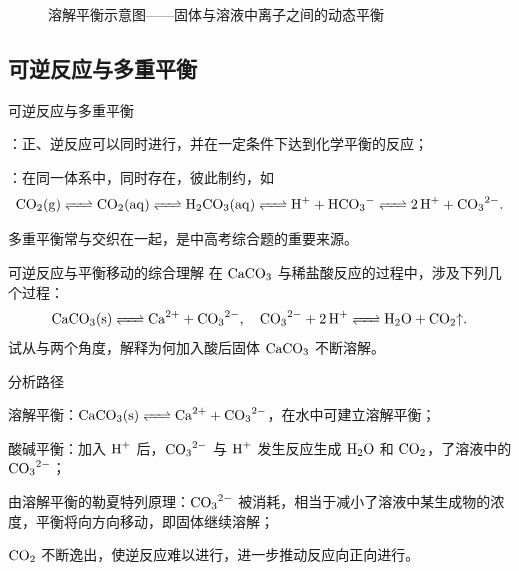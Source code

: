 \documentclass[a4paper,11pt]{ctexart}
\begin{document}
\begin{figure}[htbp]
  \centering
  \caption{溶解平衡示意图——固体与溶液中离子之间的动态平衡}
\end{figure}

\subsection{可逆反应与多重平衡}

\begin{definitionbox}{可逆反应与多重平衡}
  \begin{focuspoints}
    \item {}：正、逆反应可以同时进行，并在一定条件下达到化学平衡的反应；
    \item {}：在同一体系中，同时存在，彼此制约，如
    \[
      \ce{CO2(g) <=> CO2(aq) <=> H2CO3(aq) <=> H^+ + HCO3^- <=> 2H^+ + CO3^{2-}}.
    \]
    \item 多重平衡常与交织在一起，是中高考综合题的重要来源。
  \end{focuspoints}
\end{definitionbox}

\begin{examplebox}{可逆反应与平衡移动的综合理解}
  在 $\ce{CaCO3}$ 与稀盐酸反应的过程中，涉及下列几个过程：
  \[
    \ce{CaCO3(s) <=> Ca^{2+} + CO3^{2-}},\quad
    \ce{CO3^{2-} + 2H^+ <=> H2O + CO2\uparrow}.
  \]
  试从与两个角度，解释为何加入酸后固体 $\ce{CaCO3}$ 不断溶解。

  \begin{proofbox}{分析路径}
    \begin{focuspoints}
      \item 溶解平衡：$\ce{CaCO3(s) <=> Ca^{2+} + CO3^{2-}}$，在水中可建立溶解平衡；
      \item 酸碱平衡：加入 $\ce{H^+}$ 后，$\ce{CO3^{2-}}$ 与 $\ce{H^+}$ 发生反应生成 $\ce{H2O}$ 和 $\ce{CO2}$，了溶液中的 $\ce{CO3^{2-}}$；
      \item 由溶解平衡的勒夏特列原理：$\ce{CO3^{2-}}$ 被消耗，相当于减小了溶液中某生成物的浓度，平衡将向方向移动，即固体继续溶解；
      \item $\ce{CO2}$ 不断逸出，使逆反应难以进行，进一步推动反应向正向进行。
    \end{focuspoints}
  \end{proofbox}
\end{examplebox}
\end{document}
